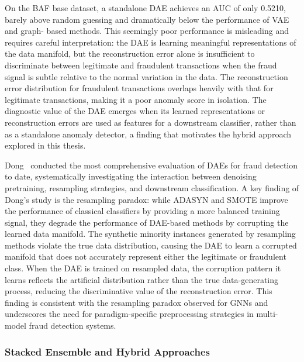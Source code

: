 On the BAF base dataset, a standalone DAE achieves an AUC of only 0.5210, barely
above random guessing and dramatically below the performance of VAE and graph-
based methods. This seemingly poor performance is misleading and requires
careful interpretation: the DAE is learning meaningful representations of the
data manifold, but the reconstruction error alone is insufficient to
discriminate between legitimate and fraudulent transactions when the fraud
signal is subtle relative to the normal variation in the data. The
reconstruction error distribution for fraudulent transactions overlaps heavily
with that for legitimate transactions, making it a poor anomaly score in
isolation. The diagnostic value of the DAE emerges when its learned
representations or reconstruction errors are used as features for a downstream
classifier, rather than as a standalone anomaly detector, a finding that
motivates the hybrid approach explored in this thesis.

Dong~\cite{dong2025enhanced} conducted the most comprehensive evaluation of DAEs
for fraud detection to date, systematically investigating the interaction
between denoising pretraining, resampling strategies, and downstream
classification. A key finding of Dong's study is the resampling paradox: while
ADASYN and SMOTE improve the performance of classical classifiers by providing a
more balanced training signal, they degrade the performance of DAE-based methods
by corrupting the learned data manifold. The synthetic minority instances
generated by resampling methods violate the true data distribution, causing the
DAE to learn a corrupted manifold that does not accurately represent either the
legitimate or fraudulent class. When the DAE is trained on resampled data, the
corruption pattern it learns reflects the artificial distribution rather than
the true data-generating process, reducing the discriminative value of the
reconstruction error. This finding is consistent with the resampling paradox
observed for GNNs and underscores the need for paradigm-specific preprocessing
strategies in multi-model fraud detection systems.

\subsubsection{Stacked Ensemble and Hybrid Approaches}

